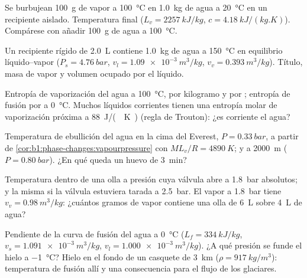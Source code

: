\begin{exercise}[$\star$]\label{exo:b1:phase-changes:2}
Se burbujean \qty{100}{g} de vapor a \qty{100}{\degreeCelsius} en
\qty{1.0}{kg} de agua a \qty{20}{\degreeCelsius} en un recipiente aislado.
Temperatura final ($L_v = \qty{2257}{kJ/kg}$, $c = \qty{4.18}{kJ/(kg.K)}$).
Compárese con añadir \qty{100}{g} de agua a \qty{100}{\degreeCelsius}.
\end{exercise}

\begin{exercise}[$\star$]\label{exo:b1:phase-changes:3}
Un recipiente rígido de \qty{2.0}{L} contiene \qty{1.0}{kg} de agua a
\qty{150}{\degreeCelsius} en equilibrio líquido--vapor ($P_s =
\qty{4.76}{bar}$, $v_l = \qty{1.09e-3}{m^3/kg}$, $v_v = \qty{0.393}{m^3/kg}$).
Título, masa de vapor y volumen ocupado por el líquido.
\end{exercise}

\begin{exercise}[$\star$]\label{exo:b1:phase-changes:4}
Entropía de vaporización del agua a \qty{100}{\degreeCelsius}, por
kilogramo y por ; entropía de fusión por  a \qty{0}{\degreeCelsius}.
Muchos líquidos corrientes tienen una entropía molar de vaporización
próxima a \qty{88}{J/(.K)} (regla de Trouton): ¿es corriente el agua?
\end{exercise}

\begin{exercise}[$\star\star$]\label{exo:b1:phase-changes:5}
Temperatura de ebullición del agua en la cima del Everest, $P =
\qty{0.33}{bar}$, a partir de \cref{cor:b1:phase-changes:vapourpressure} con
$ML_v/R = \qty{4890}{K}$; y a \qty{2000}{m} ($P = \qty{0.80}{bar}$). ¿En qué
queda un huevo de \qty{3}{min}?
\end{exercise}

\begin{exercise}[$\star\star$]\label{exo:b1:phase-changes:6}
Temperatura dentro de una olla a presión cuya válvula abre a \qty{1.8}{bar}
absolutos; y la misma si la válvula estuviera tarada a \qty{2.5}{bar}. El
vapor a \qty{1.8}{bar} tiene $v_v = \qty{0.98}{m^3/kg}$: ¿cuántos gramos de
vapor contiene una olla de \qty{6}{L} sobre \qty{4}{L} de agua?
\end{exercise}

\begin{exercise}[$\star\star$]\label{exo:b1:phase-changes:7}
Pendiente de la curva de fusión del agua a \qty{0}{\degreeCelsius} ($L_f =
\qty{334}{kJ/kg}$, $v_s = \qty{1.091e-3}{m^3/kg}$, $v_l = \qty{1.000e-3}{m^3/kg}$).
¿A qué presión se funde el hielo a \qty{-1}{\degreeCelsius}? Hielo en el
fondo de un casquete de \qty{3}{km} ($\rho = \qty{917}{kg/m^3}$):
temperatura de fusión allí y una consecuencia para el flujo de los glaciares.
\end{exercise}

